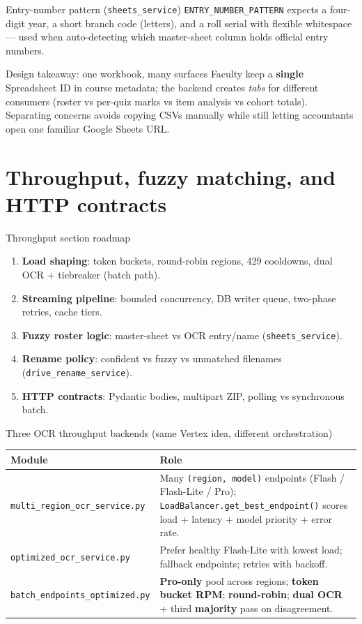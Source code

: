 \documentclass[aspectratio=169]{beamer}
\begin{document}
\begin{frame}{Entry-number pattern (\texttt{sheets\_service})}
  \small
  \texttt{ENTRY\_NUMBER\_PATTERN} expects a four-digit year, a short branch code (letters), and a roll serial with flexible whitespace --- used when auto-detecting which master-sheet column holds official entry numbers.
\end{frame}

\begin{frame}{Design takeaway: one workbook, many surfaces}
  \small
  Faculty keep a \textbf{single} Spreadsheet ID in course metadata; the backend creates \emph{tabs} for different consumers (roster vs per-quiz marks vs item analysis vs cohort totals).\\
  Separating concerns avoids copying CSVs manually while still letting accountants open one familiar Google Sheets URL.
\end{frame}
\section{Throughput, fuzzy matching, and HTTP contracts}

\begin{frame}{Throughput section roadmap}
  \small
  \begin{enumerate}
    \item \textbf{Load shaping}: token buckets, round-robin regions, 429 cooldowns, dual OCR + tiebreaker (batch path).
    \item \textbf{Streaming pipeline}: bounded concurrency, DB writer queue, two-phase retries, cache tiers.
    \item \textbf{Fuzzy roster logic}: master-sheet vs OCR entry/name (\texttt{sheets\_service}).
    \item \textbf{Rename policy}: confident vs fuzzy vs unmatched filenames (\texttt{drive\_rename\_service}).
    \item \textbf{HTTP contracts}: Pydantic bodies, multipart ZIP, polling vs synchronous batch.
  \end{enumerate}
\end{frame}

\begin{frame}{Three OCR throughput backends (same Vertex idea, different orchestration)}
  \tiny
  \begin{tabular}{@{}p{3.2cm}p{11.4cm}@{}}
    \toprule
    Module & Role \\
    \midrule
    \texttt{multi\_region\_ocr\_service.py} & Many \texttt{(region, model)} endpoints (Flash / Flash-Lite / Pro); \texttt{LoadBalancer.get\_best\_endpoint()} scores load + latency + model priority + error rate. \\
    \texttt{optimized\_ocr\_service.py} & Prefer healthy Flash-Lite with lowest load; fallback endpoints; retries with backoff. \\
    \texttt{batch\_endpoints\_optimized.py} & \textbf{Pro-only} pool across regions; \textbf{token bucket RPM}; \textbf{round-robin}; \textbf{dual OCR} + third \textbf{majority} pass on disagreement. \\
    \bottomrule
  \end{tabular}
\end{frame}
\end{document}
